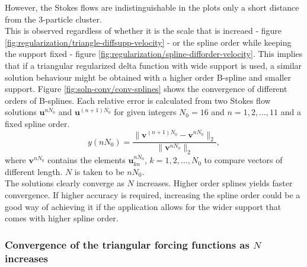 \documentclass[a4paper,
twoside=false,abstract=false,numbers=noenddot,
titlepage=false,headings=small,parskip=half,version=last]{scrartcl}
\begin{document}
However, the Stokes flows are indistinguishable in the plots only a short distance from the 3-particle cluster.\\
This is observed regardless of whether it is the scale that is increaed - figure \ref{fig:regularization/triangle-diffsupp-velocity} - or the spline order while keeping the support fixed - figure \ref{fig:regularization/spline-difforder-velocity}. This implies that if a triangular regularized delta function with wide support is used, a similar solution behaviour might be obtained with a higher order B-spline and smaller support.
Figure \ref{fig:soln-conv/conv-splines} shows the convergence of different orders of B-splines.
Each relative error is calculated from two Stokes flow solutions $\mathbf{u}^{nN_0}$ and $\mathbf{u}^{(n+1)N_0}$ for given integers $N_0=16$ and $n=1,2,...,11$ and a fixed spline order.
\begin{equation}
y(nN_0) = \frac{\|\mathbf{v}^{(n+1)N_0}-\mathbf{v}^{nN_0}\|_2}{\|\mathbf{v}^{nN_0}\|_2},
\end{equation}
where $\mathbf{v}^{nN_0}$ contains the elements $\mathbf{u}^{nN_0}_{kn}$, $k=1,2,...,N_0$ to compare vectors of different length. $N$ is taken to be $nN_0$.\\
The solutions clearly converge as $N$ increases.
Higher order splines yields faster convergence.
If higher accuracy is required, increasing the spline order could be a good way of achieving it if the application allows for the wider support that comes with higher spline order.

\subsubsection{Convergence of the triangular forcing functions as $N$ increases}
\end{document}
